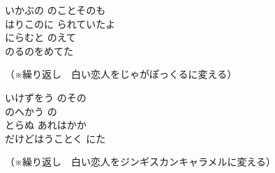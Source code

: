 \documentclass[10pt,b5j]{tarticle} %
\begin{document}
\begin{enumerate} %
    \begin{minipage}[c]{\blocksize}
    
        
        \vspace{\linespace}
        \item
        いかぶの
        のことそのも\\
        はりこのに
        られていたよ\\
        にらむと
        のえて\\
        のるのをめてた
        
        \vspace{\linespace}
        {\footnotesize（※繰り返し　白い恋人をじゃがぽっくるに変える）}
        
    \end{minipage}
    \begin{minipage}[c]{\blocksize}

        \vspace{\linespace}
        \item
        いけずをう
        のその\\
        のへかう
        の\\
        とらぬ
        あれはかか\\
        だけどはうことく
        にた

        \vspace{\linespace}
        {\footnotesize（※繰り返し　白い恋人をジンギスカンキャラメルに変える）}

    \end{minipage}
\end{enumerate} %
\end{document}

